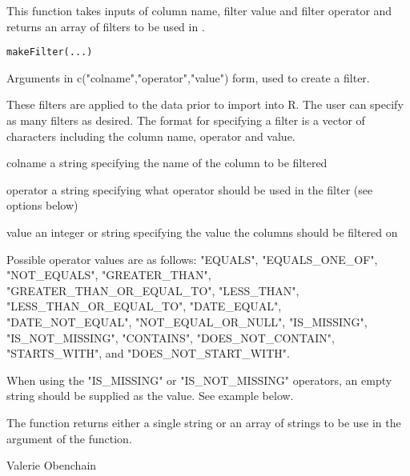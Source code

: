 \begin{Description}\relax
This function takes inputs of column name, filter value and filter operator and 
returns an array of filters to be used in .
\end{Description}
\begin{Usage}
\begin{verbatim}
makeFilter(...)
\end{verbatim}
\end{Usage}
\begin{Arguments}
\begin{ldescription}
\item[\code{...}] Arguments in c("colname","operator","value") form, used to create a filter.
\end{ldescription}
\end{Arguments}
\begin{Details}\relax
These filters are applied to the data prior to import into R. The user can specify as many 
filters as desired. The format for specifying a filter is a vector of characters including
the column name, operator and value.
\item[colname] a string specifying the name of the column to be filtered 
\item[operator] a string specifying what operator should be used in the filter (see options below)
\item[value] an integer or string specifying the value the columns should be filtered on

Possible operator values are as follows:
"EQUALS", "EQUALS\_ONE\_OF", "NOT\_EQUALS", "GREATER\_THAN", "GREATER\_THAN\_OR\_EQUAL\_TO", 
"LESS\_THAN", "LESS\_THAN\_OR\_EQUAL\_TO", "DATE\_EQUAL", "DATE\_NOT\_EQUAL", 
"NOT\_EQUAL\_OR\_NULL", "IS\_MISSING", "IS\_NOT\_MISSING", "CONTAINS", "DOES\_NOT\_CONTAIN", 
"STARTS\_WITH", and "DOES\_NOT\_START\_WITH".

When using the "IS\_MISSING" or "IS\_NOT\_MISSING" operators, an empty string should be supplied as the value.
See example below.
\end{Details}
\begin{Value}
The function returns either a single string or an array of strings to be use in the
 argument of the  function.
\end{Value}
\begin{Author}\relax
Valerie Obenchain
\end{Author}
